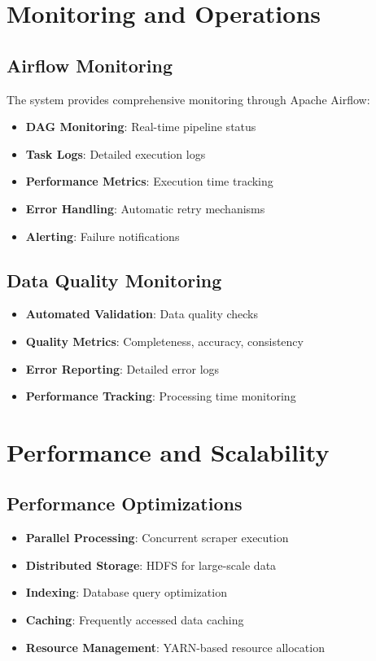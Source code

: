 \documentclass[12pt,a4paper]{article}
\begin{document}
\section{Monitoring and Operations}

\subsection{Airflow Monitoring}
The system provides comprehensive monitoring through Apache Airflow:

\begin{itemize}
    \item \textbf{DAG Monitoring}: Real-time pipeline status
    \item \textbf{Task Logs}: Detailed execution logs
    \item \textbf{Performance Metrics}: Execution time tracking
    \item \textbf{Error Handling}: Automatic retry mechanisms
    \item \textbf{Alerting}: Failure notifications
\end{itemize}

\subsection{Data Quality Monitoring}
\begin{itemize}
    \item \textbf{Automated Validation}: Data quality checks
    \item \textbf{Quality Metrics}: Completeness, accuracy, consistency
    \item \textbf{Error Reporting}: Detailed error logs
    \item \textbf{Performance Tracking}: Processing time monitoring
\end{itemize}

\section{Performance and Scalability}

\subsection{Performance Optimizations}
\begin{itemize}
    \item \textbf{Parallel Processing}: Concurrent scraper execution
    \item \textbf{Distributed Storage}: HDFS for large-scale data
    \item \textbf{Indexing}: Database query optimization
    \item \textbf{Caching}: Frequently accessed data caching
    \item \textbf{Resource Management}: YARN-based resource allocation
\end{itemize}
\end{document}
